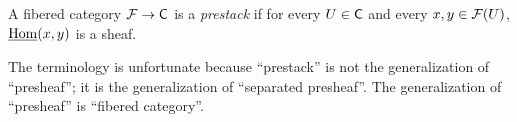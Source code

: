  \begin{definition}
   A fibered category $\mathcal{F}\to \text{\sf C}$ is a \emph{prestack} if for every $U\in \text{\sf C}$ and every
   $x,y\in \mathcal{F}(U)$, $\operatorname{\underline{Hom}}(x,y)$ is a sheaf.
 \end{definition}
 \begin{remark}
   The terminology is unfortunate because ``prestack'' is not the generalization of
   ``presheaf''; it is the generalization of ``separated presheaf''. The generalization of
   ``presheaf'' is ``fibered category''.
 \end{remark}
